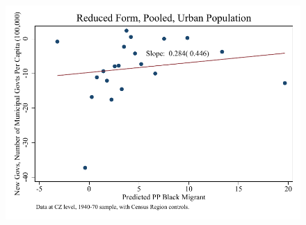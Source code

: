 \documentclass{article}
\begin{document}
\begin{figure}
\centering
\includegraphics{figures/simplefigs/pooled_gen_muni_pc_C3_urban_rf.pdf}
\end{figure}
\clearpage
\end{document}
